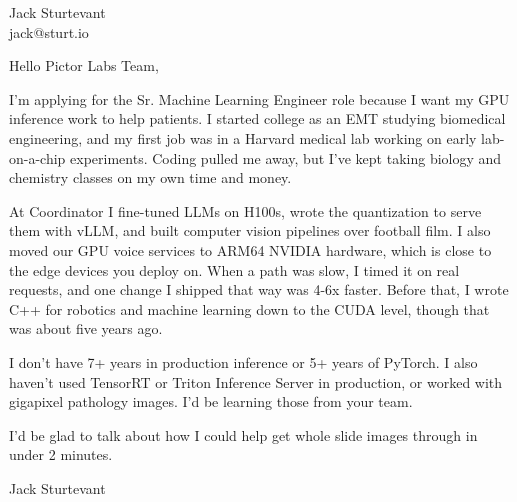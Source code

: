 \documentclass[11pt]{article}
\begin{document}
\raggedright

{\namefont\fontsize{20pt}{24pt}\selectfont Jack Sturtevant}\\[-0.3em]
jack@sturt.io

\vspace{1.2em}

Hello Pictor Labs Team,

I'm applying for the Sr. Machine Learning Engineer role because I want my GPU inference work to help patients. I started college as an EMT studying biomedical engineering, and my first job was in a Harvard medical lab working on early lab-on-a-chip experiments. Coding pulled me away, but I've kept taking biology and chemistry classes on my own time and money.

At Coordinator I fine-tuned LLMs on H100s, wrote the quantization to serve them with vLLM, and built computer vision pipelines over football film. I also moved our GPU voice services to ARM64 NVIDIA hardware, which is close to the edge devices you deploy on. When a path was slow, I timed it on real requests, and one change I shipped that way was 4-6x faster. Before that, I wrote C++ for robotics and machine learning down to the CUDA level, though that was about five years ago.

I don't have 7+ years in production inference or 5+ years of PyTorch. I also haven't used TensorRT or Triton Inference Server in production, or worked with gigapixel pathology images. I'd be learning those from your team.

I'd be glad to talk about how I could help get whole slide images through in under 2 minutes.

\vspace{0.6em}
Jack Sturtevant
\end{document}
